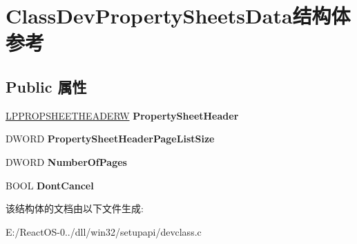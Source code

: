 \hypertarget{struct_class_dev_property_sheets_data}{}\section{Class\+Dev\+Property\+Sheets\+Data结构体 参考}
\label{struct_class_dev_property_sheets_data}
\subsection*{Public 属性}
\begin{DoxyCompactItemize}
\item 
\mbox{\label{struct_class_dev_property_sheets_data_afc12d5eaf4cf167a89c831c0e0496a95}} 
\hyperlink{struct___p_r_o_p_s_h_e_e_t_h_e_a_d_e_r_w}{L\+P\+P\+R\+O\+P\+S\+H\+E\+E\+T\+H\+E\+A\+D\+E\+RW} {\bfseries Property\+Sheet\+Header}
\item 
\mbox{\label{struct_class_dev_property_sheets_data_ada07c054631c20dcdd1f268d68a89cdc}} 
D\+W\+O\+RD {\bfseries Property\+Sheet\+Header\+Page\+List\+Size}
\item 
\mbox{\label{struct_class_dev_property_sheets_data_afc8e2117349f26161f5e5fca9a689823}} 
D\+W\+O\+RD {\bfseries Number\+Of\+Pages}
\item 
\mbox{\label{struct_class_dev_property_sheets_data_a6abac1d5687a854facd049f129c3937f}} 
B\+O\+OL {\bfseries Dont\+Cancel}
\end{DoxyCompactItemize}


该结构体的文档由以下文件生成\+:\begin{DoxyCompactItemize}
\item 
E\+:/\+React\+O\+S-\/0../dll/win32/setupapi/devclass.\+c\end{DoxyCompactItemize}
